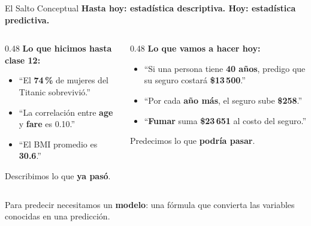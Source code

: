 \documentclass[aspectratio=169, 11pt]{beamer}
\begin{document}
\begin{frame}[shrink=5]{El Salto Conceptual}
  \vspace{-4pt}
  {\footnotesize\color{arcaDark}\bfseries
    Hasta hoy: estadística descriptiva. Hoy: estadística predictiva.}

  \vspace{8pt}
  \begin{columns}[T]
    \begin{column}{0.48\textwidth}
      {\footnotesize\bfseries\color{textMuted}\faChartBar\hspace{4pt}
        Lo que hicimos hasta clase 12:}
      \vspace{4pt}

      {\scriptsize
      \begin{itemize}\setlength{\itemsep}{5pt}
        \item ``El \textbf{74\,\%} de mujeres del Titanic sobrevivió.''
        \item ``La correlación entre \textbf{age} y \textbf{fare} es 0.10.''
        \item ``El BMI promedio es \textbf{30.6}.''
      \end{itemize}
      }

      \vspace{4pt}
      {\scriptsize\color{textMuted}
        Describimos lo que \textbf{ya pasó}.}
    \end{column}

    \begin{column}{0.48\textwidth}
      {\footnotesize\bfseries\color{arcaRed}\faRocket\hspace{4pt}
        Lo que vamos a hacer hoy:}
      \vspace{4pt}

      {\scriptsize
      \begin{itemize}\setlength{\itemsep}{5pt}
        \item ``Si una persona tiene \textbf{40 años}, predigo
          que su seguro costará \textbf{\$13\,500}.''
        \item ``Por cada \textbf{año más}, el seguro sube \textbf{\$258}.''
        \item ``\textbf{Fumar} suma \textbf{\$23\,651} al costo del seguro.''
      \end{itemize}
      }

      \vspace{4pt}
      {\scriptsize\color{arcaDark}
        Predecimos lo que \textbf{podría pasar}.}
    \end{column}
  \end{columns}

  \vspace{8pt}
  {\footnotesize\color{arcaDark}
    \faLightbulb\hspace{4pt}
    Para predecir necesitamos un \textbf{modelo}: una fórmula que
    convierta las variables conocidas en una predicción.}
\end{frame}
\end{document}
